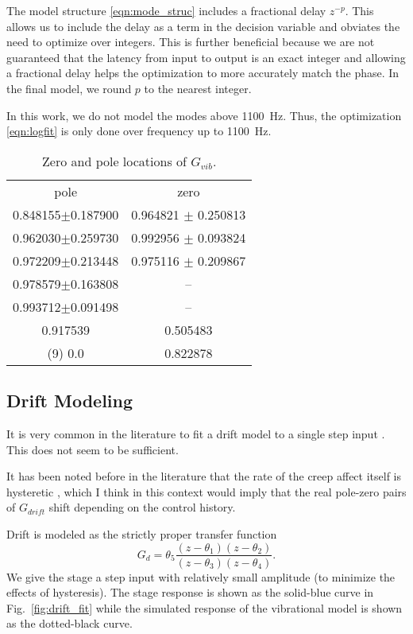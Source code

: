 \documentclass[journal,twocolumn,twoside]{IEEEtran}
\begin{document}
The model structure \eqref{eqn:mode_struc} includes a fractional delay $z^{-p}$. This allows us to include the delay as a term in the decision variable and obviates the need to optimize over integers. This is further beneficial because we are not guaranteed that the latency from input to output is an exact integer and allowing a fractional delay helps the optimization to more accurately match the phase. In the final model, we round $p$ to the nearest integer. 

In this work, we do not model the modes above 1100~Hz. Thus, the optimization \eqref{eqn:logfit} is only done over frequency up to 1100~Hz. 

\begin{table}
  \centering
  \caption{Zero and pole locations of $G_{vib}$. }
  \begin{tabular}{cc}
    pole & zero\\
    0.848155$\pm$0.187900 & 0.964821 $\pm$ 0.250813\\ 
    0.962030$\pm$0.259730 & 0.992956 $\pm$ 0.093824\\ 
    0.972209$\pm$0.213448 & 0.975116 $\pm$ 0.209867\\ 
    0.978579$\pm$0.163808 & --\\ 
    0.993712$\pm$0.091498 & --\\ 
    0.917539 & 0.505483 \\ 
    (9) 0.0 & 0.822878 \\ 
  \end{tabular}
\end{table}


\subsection{Drift Modeling}\label{sec:drift_model}

It is very common in the literature to fit a drift model to a single step input \cite{liu_creep_2013, croft_creep_1999}. This does not seem to be sufficient.

It has been noted before in the literature that the rate of the creep affect itself is hysteretic \cite{Jung_open_loop_2000}, which I think in this context would imply that the real pole-zero pairs of $G_{drift}$ shift depending on the control history.


Drift is modeled as the strictly proper transfer function
\begin{equation}
G_d = \theta_5\frac{(z-\theta_1)(z-\theta_2)}{(z-\theta_3)(z-\theta_4)}.\label{eqn:fit_drift_cost}
\end{equation}
We give the stage a step input with relatively small amplitude (to minimize the effects of hysteresis). The stage response is shown as the solid-blue curve in Fig.~\ref{fig:drift_fit} while the simulated response of the vibrational model is shown as the dotted-black curve. 
\end{document}

